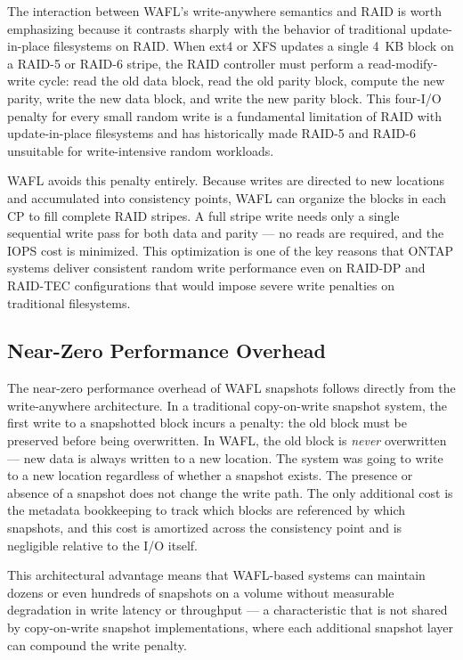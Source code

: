 The interaction between WAFL's write-anywhere semantics and RAID is worth emphasizing because it contrasts sharply with the behavior of traditional update-in-place filesystems on RAID. When ext4 or XFS updates a single 4~KB block on a RAID-5 or RAID-6 stripe, the RAID controller must perform a read-modify-write cycle: read the old data block, read the old parity block, compute the new parity, write the new data block, and write the new parity block. This four-I/O penalty for every small random write is a fundamental limitation of RAID with update-in-place filesystems and has historically made RAID-5 and RAID-6 unsuitable for write-intensive random workloads.

WAFL avoids this penalty entirely. Because writes are directed to new locations and accumulated into consistency points, WAFL can organize the blocks in each CP to fill complete RAID stripes. A full stripe write needs only a single sequential write pass for both data and parity --- no reads are required, and the IOPS cost is minimized. This optimization is one of the key reasons that ONTAP systems deliver consistent random write performance even on RAID-DP and RAID-TEC configurations that would impose severe write penalties on traditional filesystems.

\subsection{Near-Zero Performance Overhead}

The near-zero performance overhead of WAFL snapshots follows directly from the write-anywhere architecture. In a traditional copy-on-write snapshot system, the first write to a snapshotted block incurs a penalty: the old block must be preserved before being overwritten. In WAFL, the old block is \emph{never} overwritten --- new data is always written to a new location. The system was going to write to a new location regardless of whether a snapshot exists. The presence or absence of a snapshot does not change the write path. The only additional cost is the metadata bookkeeping to track which blocks are referenced by which snapshots, and this cost is amortized across the consistency point and is negligible relative to the I/O itself.

This architectural advantage means that WAFL-based systems can maintain dozens or even hundreds of snapshots on a volume without measurable degradation in write latency or throughput --- a characteristic that is not shared by copy-on-write snapshot implementations, where each additional snapshot layer can compound the write penalty.


